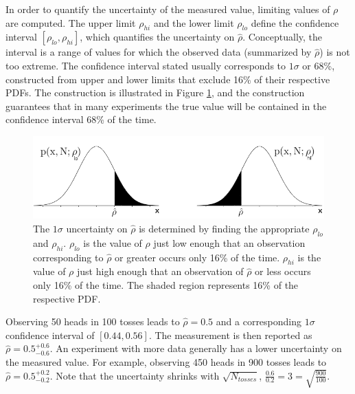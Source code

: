 \documentclass[12pt]{article}
\begin{document}
In order to quantify the uncertainty of the measured value, limiting values of $\rho$ are computed. The upper limit $\rho_{hi}$ and the lower limit $\rho_{lo}$ define the confidence interval $[\rho_{lo}, \rho_{hi}]$, which quantifies the uncertainty on $\hat{\rho}$. Conceptually, the interval is a range of values for which the observed data (summarized by $\hat{\rho}$) is not too extreme. The confidence interval stated usually corresponds to $1\sigma$ or 68\%, constructed from upper and lower limits that exclude 16\% of their respective PDFs. The construction is illustrated in Figure \ref{fig:meas_uncertainty}, and the construction guarantees that in many experiments the true value will be contained in the confidence interval 68\% of the time.    

\begin{figure}[h!]
  \centering
  \includegraphics[width=6in]{images/plow_and_phi.png}
  \caption[Defining the confidence interval.]
   {The $1\sigma$ uncertainty on $\hat{\rho}$ is determined by finding the appropriate $\rho_{lo}$ and $\rho_{hi}$. $\rho_{lo}$ is the value of $\rho$ just low enough that an observation corresponding to $\hat{\rho}$ or greater occurs only 16\% of the time. $\rho_{hi}$ is the value of $\rho$ just high enough that an observation of $\hat{\rho}$ or less occurs only 16\% of the time. The shaded region represents 16\% of the respective PDF.}
\label{fig:meas_uncertainty}
\end{figure}

Observing 50 heads in 100 tosses leads to $\hat{\rho} = 0.5$ and a corresponding $1\sigma$ confidence interval of $[0.44, 0.56]$. The measurement is then reported as $\hat{\rho} = 0.5^{+0.6}_{-0.6}$. An experiment with more data generally has a lower uncertainty on the measured value. For example, observing 450 heads in 900 tosses leads to $\hat{\rho} = 0.5^{+0.2}_{-0.2}$. Note that the uncertainty shrinks with $\sqrt{N_{tosses}}$, $\frac{0.6}{0.2} = 3 = \sqrt{\frac{900}{100}}$.
\end{document}

